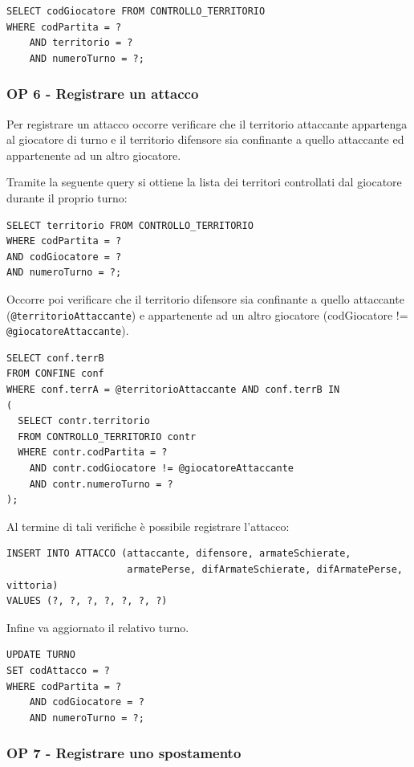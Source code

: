 \documentclass[a4paper,12pt]{report}
\begin{document}
\begin{verbatim}
SELECT codGiocatore FROM CONTROLLO_TERRITORIO 
WHERE codPartita = ? 
    AND territorio = ? 
    AND numeroTurno = ?;
\end{verbatim}

\subsubsection{OP 6 - Registrare un attacco}

Per registrare un attacco occorre verificare che il territorio attaccante appartenga al giocatore di turno e
il territorio difensore sia confinante a quello attaccante ed appartenente ad un altro giocatore.

Tramite la seguente query si ottiene la lista dei territori controllati dal giocatore durante il proprio turno:
\begin{verbatim}
SELECT territorio FROM CONTROLLO_TERRITORIO
WHERE codPartita = ? 
AND codGiocatore = ? 
AND numeroTurno = ?;
\end{verbatim}

Occorre poi verificare che il territorio difensore sia confinante a quello attaccante \\ (\texttt{@territorioAttaccante}) e appartenente ad un altro giocatore (codGiocatore != \\ \texttt{@giocatoreAttaccante}).
\begin{verbatim}
SELECT conf.terrB 
FROM CONFINE conf 
WHERE conf.terrA = @territorioAttaccante AND conf.terrB IN 
(
  SELECT contr.territorio 
  FROM CONTROLLO_TERRITORIO contr 
  WHERE contr.codPartita = ? 
    AND contr.codGiocatore != @giocatoreAttaccante
    AND contr.numeroTurno = ? 
);
\end{verbatim}

Al termine di tali verifiche è possibile registrare l'attacco:

\begin{verbatim}
INSERT INTO ATTACCO (attaccante, difensore, armateSchierate, 
                     armatePerse, difArmateSchierate, difArmatePerse, vittoria) 
VALUES (?, ?, ?, ?, ?, ?, ?)
\end{verbatim}
Infine va aggiornato il relativo turno.
\begin{verbatim}
UPDATE TURNO 
SET codAttacco = ? 
WHERE codPartita = ? 
    AND codGiocatore = ?
    AND numeroTurno = ?;
\end{verbatim}

\subsubsection{OP 7 - Registrare uno spostamento}
\end{document}
